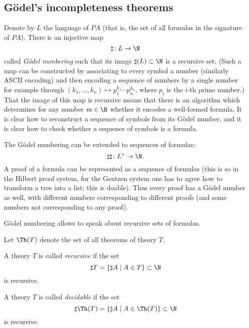 \begin{page}
\setcounter{section}{3}
\setcounter{subsection}{5}
\setcounter{dfn}{31}
\label{portion:758}

\subsection{G\"odel's incompleteness theorems}
Denote by $L$ the language of $PA$ (that is, the set of all formulas in the signature of $PA$).
There is an injective map
\[
\sharp \colon L \to \N
\]
called \emph{G\"odel numbering} such that its image $\sharp(L) \subset \N$ is a recursive set.
(Such a map can be constructed by associating to every symbol a number (similarly ASCII encoding) and then encoding a sequence of numbers by a single number
for example through $(k_1, \ldots, k_n) \mapsto p_1^{k_1} \cdots p_n^{k_n}$, where $p_i$ is the $i$-th prime number.)
That the image of this map is recursive means that there is an algorithm which determines for any number $m \in \N$ whether it encodes a well-formed formula.
It is clear how to reconstruct a sequence of symbols from its G\"odel number, and it is clear how to check whether a sequence of symbols is a formula.

The G\"odel numbering can be extended to sequences of formulas:
\[
\sharp\sharp \colon L^* \to \N.
\]
A proof of a formula can be represented as a sequence of formulas
(this is so in the Hilbert proof system, for the Gentzen system one has to agree how to transform a tree into a list; this is doable).
Thus every proof has a G\"odel number as well, with different numbers corresponding to different proofs (and some numbers not corresponding to any proof).

G\"odel numbering allows to speak about recursive sets of formulas.

Let $\Th(T)$ denote the set of all theorems of theory $T$.


\end{page}

\begin{page}
\setcounter{section}{3}
\setcounter{subsection}{5}
\setcounter{dfn}{32}
\label{portion:760}

\begin{dfn}
A theory $T$ is called \emph{recursive} if the set
\[
\sharp T = \{\sharp A \mid A \in T\} \subset \N
\]
is recursive.

A theory $T$ is called \emph{decidable} if the set
\[
\sharp \Th(T) = \{\sharp A \mid A \in \Th(T)\} \subset \N
\]
is recursive.
\end{dfn}

\end{page}

